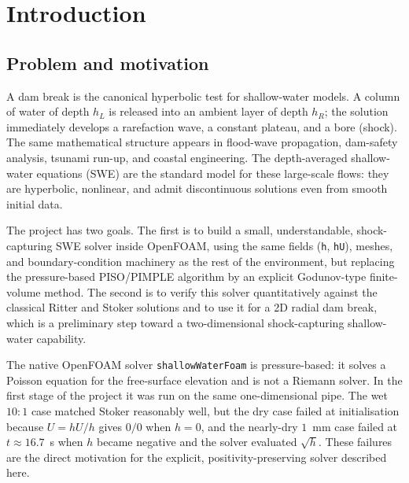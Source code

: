 ﻿\documentclass[11pt,a4paper]{article}
\begin{document}
\section{Introduction}

\subsection{Problem and motivation}
A dam break is the canonical hyperbolic test for shallow-water models.  A
column of water of depth $h_L$ is released into an ambient layer of depth
$h_R$; the solution immediately develops a rarefaction wave, a constant
plateau, and a bore (shock).  The same mathematical structure appears in
flood-wave propagation, dam-safety analysis, tsunami run-up, and coastal
engineering.  The depth-averaged shallow-water equations (SWE) are the standard
model for these large-scale flows: they are hyperbolic, nonlinear, and admit
discontinuous solutions even from smooth initial data.

The project has two goals.  The first is to build a small, understandable,
shock-capturing SWE solver inside OpenFOAM, using the same fields
(\texttt{h}, \texttt{hU}), meshes, and boundary-condition machinery as the rest
of the environment, but replacing the pressure-based PISO/PIMPLE algorithm by
an explicit Godunov-type finite-volume method.  The second is to verify this
solver quantitatively against the classical Ritter and Stoker solutions and to
use it for a 2D radial dam break, which is a preliminary step toward a
two-dimensional shock-capturing shallow-water capability.

The native OpenFOAM solver \texttt{shallowWaterFoam} is pressure-based: it
solves a Poisson equation for the free-surface elevation and is not a Riemann
solver.  In the first stage of the project it was run on the same one-dimensional
pipe.  The wet $10:1$ case matched Stoker reasonably well, but the dry case
failed at initialisation because $U=hU/h$ gives $0/0$ when $h=0$, and the
nearly-dry $1$~mm case failed at $t\approx16.7$~s when $h$ became negative and
the solver evaluated $\sqrt{h}$.  These failures are the direct motivation for
the explicit, positivity-preserving solver described here.
\end{document}
